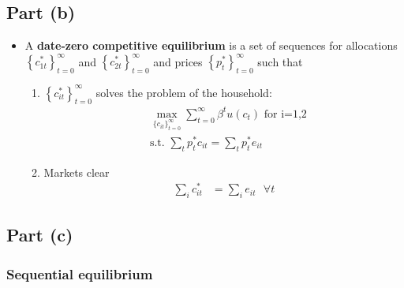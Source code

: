 \documentclass{scrartcl}
\begin{document}
\subsection*{Part (b)}

\begin{itemize}
	\item A \textbf{date-zero competitive equilibrium} is a set of sequences for allocations $\left\{c_{1t}^*\right\}_{t=0}^{\infty}$ and $\left\{c_{2t}^*\right\}_{t=0}^{\infty}$ and prices $\left\{p_{t}^*\right\}_{t=0}^{\infty}$ such that 
	
	\begin{enumerate}
		\item $\left\{c_{it}^*\right\}_{t=0}^{\infty}$ solves the problem of the household:
		\begin{align}
		&\max_{\{{c_{it}}\}_{t=0}^{\infty}} {\sum_{t=0}^{\infty} \beta^t u(c_t)} \text{ for i=1,2}\\
		&\text{s.t. } \sum_t p_{t}^* c_{it}=\sum_t p_{t}^* e_{it} \nonumber 
		\end{align}
		\item Markets clear
		\begin{align}
		\sum_{i} c^*_{it}&=\sum_{i} e_{it} \text{ } \forall t
		\end{align}
	\end{enumerate}

\end{itemize}

\subsection*{Part (c)}

\subsubsection*{Sequential equilibrium}
\end{document}
